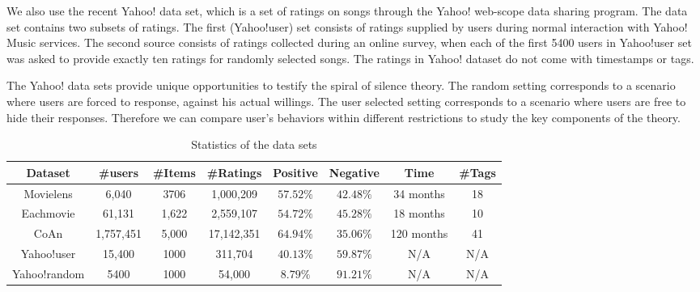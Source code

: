 \documentclass[sigconf]{acmart}
\begin{document}
We also use the recent Yahoo! data set, which is a set of ratings on songs through the Yahoo! web-scope data sharing program. The data set contains two subsets of ratings. The first (Yahoo!user) set consists of ratings supplied by users during normal interaction with Yahoo! Music services. The second source consists of ratings collected during an online survey, when each of the first 5400 users in Yahoo!user set was asked to provide exactly ten ratings for randomly selected songs. The ratings in Yahoo! dataset do not come with timestamps or tags.

The Yahoo! data sets provide unique opportunities to testify the spiral of silence theory.  The random setting corresponds to a scenario where users are forced to response, against his actual willings. The user selected setting corresponds to a scenario where users are free to hide their responses. Therefore we can compare user's behaviors within different restrictions to study the key components of the theory.
\begin{table}[htbp]
\centering
\caption{Statistics of the data sets}\label{tab:statistics}
\begin{tabular}{|c|c|c|c|c|c|c|c|}
\hline
Dataset &\#users & \#Items & \#Ratings & Positive  & Negative & Time & \#Tags\\\hline\hline
Movielens & 6,040 & 3706 & 1,000,209 & $57.52\%$ &$42.48\%$ & 34 months&18 \\\hline
Eachmovie & 61,131 & 1,622 & 2,559,107 & $54.72\%$ & $45.28\%$ &18 months &10 \\\hline
CoAn & 1,757,451 & 5,000 & 17,142,351 & $64.94\%$ & $35.06\%$ &120 months &41 \\\hline
Yahoo!user & 15,400 & 1000 & 311,704 & $40.13\%$ & $59.87\%$ & N/A & N/A\\\hline
Yahoo!random & 5400 &  1000 & 54,000 & $8.79\%$& $91.21\%$ &N/A & N/A\\
\hline
\end{tabular}
\end{table}
\end{document}
